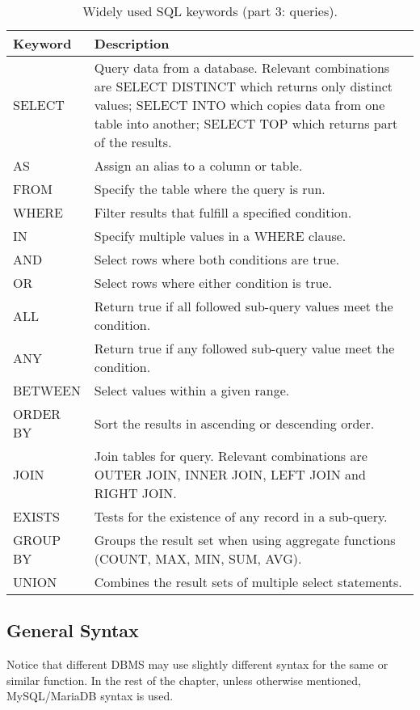 \begin{table}
	\centering \caption{Widely used SQL keywords (part 3: queries).}\label{ch:db:tab:sqlkeywords3}
	\begin{tabularx}{\textwidth}{lX}
		\hline
		Keyword & Description \\ \hline
		SELECT & Query data from a database. Relevant combinations are SELECT DISTINCT which returns only distinct values; SELECT INTO which copies data from one table into another; SELECT TOP which returns part of the results. \\ 
		AS & Assign an alias to a column or table. \\ 
		FROM & Specify the table where the query is run. \\ 
		WHERE & Filter results that fulfill a specified condition. \\ 
		IN & Specify multiple values in a WHERE clause. \\ 
		AND & Select rows where both conditions are true. \\ 
		OR & Select rows where either condition is true. \\ 
		ALL & Return true if all followed sub-query values meet the condition. \\ 
		ANY & Return true if any followed sub-query value meet the condition. \\ 
		BETWEEN & Select values within a given range. \\ 
		ORDER BY & Sort the results in ascending or descending order. \\ 
		JOIN & Join tables for query. Relevant combinations are OUTER JOIN, INNER JOIN, LEFT JOIN and RIGHT JOIN. \\ 
		EXISTS & Tests for the existence of any record in a sub-query. \\ 
		GROUP BY & Groups the result set when using aggregate functions (COUNT, MAX, MIN, SUM, AVG). \\ 
		UNION & Combines the result sets of multiple select statements. \\
		 \hline
	\end{tabularx}
\end{table}

\subsection{General Syntax}

Notice that different DBMS may use slightly different syntax for the same or similar function. In the rest of the chapter, unless otherwise mentioned, MySQL/MariaDB syntax is used. 

